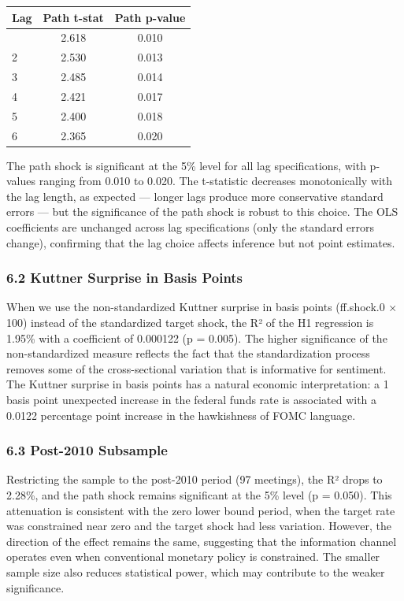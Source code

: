 \documentclass[12pt]{article}
\begin{document}
\begin{longtable}[]{@{}lcc@{}}
\toprule\noalign{}
Lag & Path t-stat & Path p-value \\
\midrule\noalign{}
\endhead
\bottomrule\noalign{}
\endlastfoot
1 & 2.618 & 0.010 \\
2 & 2.530 & 0.013 \\
3 & 2.485 & 0.014 \\
4 & 2.421 & 0.017 \\
5 & 2.400 & 0.018 \\
6 & 2.365 & 0.020 \\
\end{longtable}

The path shock is significant at the 5\% level for all lag
specifications, with p-values ranging from 0.010 to 0.020. The
t-statistic decreases monotonically with the lag length, as expected ---
longer lags produce more conservative standard errors --- but the
significance of the path shock is robust to this choice. The OLS
coefficients are unchanged across lag specifications (only the standard
errors change), confirming that the lag choice affects inference but not
point estimates.

\subsubsection{6.2 Kuttner Surprise in Basis
Points}\label{kuttner-surprise-in-basis-points}

When we use the non-standardized Kuttner surprise in basis points
(ff.shock.0 × 100) instead of the standardized target shock, the R² of
the H1 regression is 1.95\% with a coefficient of 0.000122 (p = 0.005).
The higher significance of the non-standardized measure reflects the
fact that the standardization process removes some of the
cross-sectional variation that is informative for sentiment. The Kuttner
surprise in basis points has a natural economic interpretation: a 1
basis point unexpected increase in the federal funds rate is associated
with a 0.0122 percentage point increase in the hawkishness of FOMC
language.

\subsubsection{6.3 Post-2010 Subsample}\label{post-2010-subsample}

Restricting the sample to the post-2010 period (97 meetings), the R²
drops to 2.28\%, and the path shock remains significant at the 5\% level
(p = 0.050). This attenuation is consistent with the zero lower bound
period, when the target rate was constrained near zero and the target
shock had less variation. However, the direction of the effect remains
the same, suggesting that the information channel operates even when
conventional monetary policy is constrained. The smaller sample size
also reduces statistical power, which may contribute to the weaker
significance.
\end{document}
